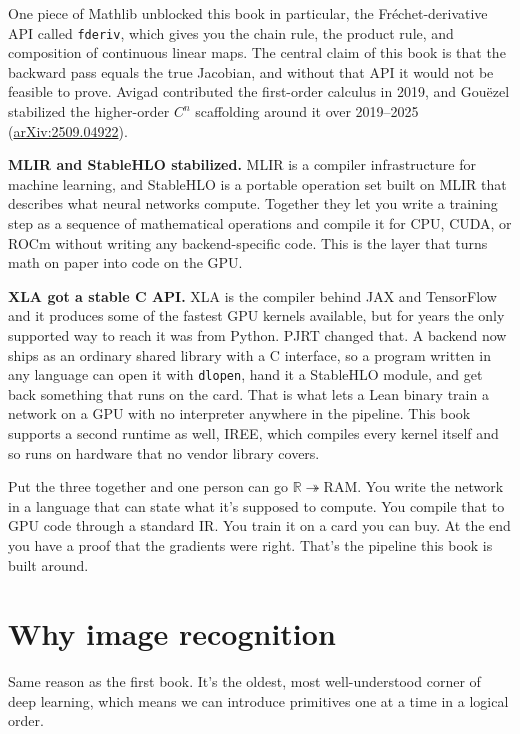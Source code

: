 One piece of Mathlib unblocked this book in particular, the
Fr\'echet-derivative API called \texttt{fderiv}, which gives you the
chain rule, the product rule, and composition of continuous linear maps.
The central claim of this book is that the backward pass equals the true
Jacobian, and without that API it would not be feasible to prove. Avigad
contributed the first-order calculus in 2019, and Gou\"ezel stabilized
the higher-order $C^n$ scaffolding around it over 2019--2025
(\href{https://arxiv.org/abs/2509.04922}{arXiv:2509.04922}).

\textbf{MLIR and StableHLO stabilized.} MLIR is a compiler infrastructure
for machine learning, and StableHLO is a portable operation set built on
MLIR that describes what neural networks compute. Together they let you
write a training step as a sequence of mathematical operations and
compile it for CPU, CUDA, or ROCm without writing any backend-specific
code. This is the layer that turns math on paper into code on the GPU.

\textbf{XLA got a stable C API.} XLA is the compiler behind JAX and
TensorFlow and it produces some of the fastest GPU kernels available, but
for years the only supported way to reach it was from Python. PJRT
changed that. A backend now ships as an ordinary shared library with a C
interface, so a program written in any language can open it with
\texttt{dlopen}, hand it a StableHLO module, and get back something that
runs on the card. That is what lets a Lean binary train a network on a
GPU with no interpreter anywhere in the pipeline. This book supports a
second runtime as well, IREE, which compiles every kernel itself and so
runs on hardware that no vendor library covers.

Put the three together and one person can go $\mathbb{R} \twoheadrightarrow \text{RAM}$. You write
the network in a language that can state what it's supposed to compute.
You compile that to GPU code through a standard IR. You train it on a
card you can buy. At the end you have a proof that the gradients were
right. That's the pipeline this book is built around.

\section*{Why image recognition}

Same reason as the first book. It's the oldest, most well-understood
corner of deep learning, which means we can introduce primitives one at a
time in a logical order.


